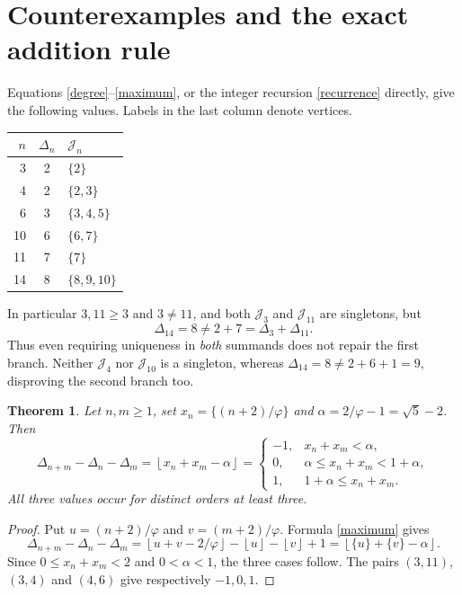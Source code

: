 \documentclass[11pt]{article}
\newtheorem{theorem}{Theorem}
\newcommand{\fl}[1]{\left\lfloor #1\right\rfloor}
\newcommand{\J}{\mathcal J}
\newcommand{\ph}{\varphi}
\begin{document}
\section{Counterexamples and the exact addition rule}
Equations \eqref{degree}--\eqref{maximum}, or the integer recursion
\eqref{recurrence} directly, give the following values. Labels in the last
column denote vertices.
\begin{center}
\begin{tabular}{rcl}
\toprule
$n$ & $\Delta_n$ & $\J_n$\\
\midrule
3 & 2 & $\{2\}$\\
4 & 2 & $\{2,3\}$\\
6 & 3 & $\{3,4,5\}$\\
10 & 6 & $\{6,7\}$\\
11 & 7 & $\{7\}$\\
14 & 8 & $\{8,9,10\}$\\
\bottomrule
\end{tabular}
\end{center}
In particular $3,11\ge3$ and $3\ne11$, and both $\J_3$ and $\J_{11}$
are singletons, but
\[
 \Delta_{14}=8\ne2+7=\Delta_3+\Delta_{11}.
\]
Thus even requiring uniqueness in \emph{both} summands does not repair
the first branch. Neither $\J_4$ nor $\J_{10}$ is a singleton, whereas
$\Delta_{14}=8\ne2+6+1=9$, disproving the second branch too.

\begin{theorem}\label{addition}
Let $n,m\ge1$, set $x_n=\{(n+2)/\ph\}$ and $\alpha=2/\ph-1=\sqrt5-2$.
Then
\begin{equation}\label{corrected}
 \Delta_{n+m}-\Delta_n-\Delta_m
 =\fl{x_n+x_m-\alpha}
 =\begin{cases}
 -1,&x_n+x_m<\alpha,\\
 0,&\alpha\le x_n+x_m<1+\alpha,\\
 1,&1+\alpha\le x_n+x_m.
 \end{cases}
\end{equation}
All three values occur for distinct orders at least three.
\end{theorem}
\begin{proof}
Put $u=(n+2)/\ph$ and $v=(m+2)/\ph$. Formula \eqref{maximum} gives
\[
 \Delta_{n+m}-\Delta_n-\Delta_m
 =\fl{u+v-2/\ph}-\fl u-\fl v+1
 =\fl{\{u\}+\{v\}-\alpha}.
\]
Since $0\le x_n+x_m<2$ and $0<\alpha<1$, the three cases follow.
The pairs $(3,11)$, $(3,4)$ and $(4,6)$ give respectively $-1,0,1$.
\end{proof}
\end{document}
